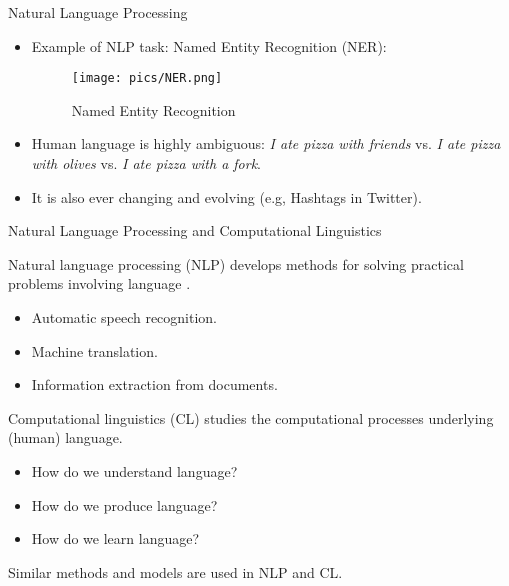 \documentclass[handout]{beamer}
\begin{document}
\begin{frame}{Natural Language Processing}
\begin{scriptsize}
\begin{itemize}
\item Example of NLP task: Named Entity Recognition (NER):


     \begin{figure}[h]
        	\texttt{[image: pics/NER.png]}
        	\caption{Named Entity Recognition}
        \end{figure}

        
\item Human language is highly ambiguous: \emph{I ate pizza with friends} vs. \emph{I ate pizza with olives} vs. \emph{I ate pizza with a fork}.

\item It is also ever changing and evolving (e.g, Hashtags in Twitter). 

\end{itemize}
\end{scriptsize}
\end{frame}


\begin{frame}{Natural Language Processing and Computational Linguistics}
\begin{scriptsize}
Natural language processing (NLP) develops methods for solving practical problems involving language \cite{JohnsonMLSS}. \\


\begin{itemize}
\item Automatic speech recognition.
\item Machine translation.
\item Information extraction from documents.
\end{itemize}

Computational linguistics (CL) studies the computational processes underlying (human) language.

\begin{itemize}
 \item How do we understand language?
 \item How do we produce language?
 \item How do we learn language?
\end{itemize}

Similar methods and models are used in NLP and CL.
\end{scriptsize}
\end{frame}
\end{document}
